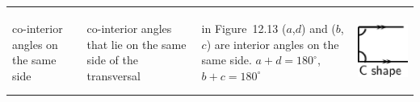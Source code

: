 \begin{center}
\begin{xtabular*}{\mytablewidth}[t]{|p{3cm}|p{3cm}|p{3cm}|p{20\mystarwidth}|}
\begin{center}
      \vspace{2pt}
    \vspace{.1in}
    \end{center}    
     \tabularnewline{}
        co-interior angles on the same side &
        co-interior angles that lie on the same side of the transversal &
        in Figure~12.13 ($a$,\begin{math}d\end{math}) and (\begin{math}b\end{math},\begin{math}c\end{math}) are interior angles on the same side. \begin{math}a+d={180}^{\circ }\end{math}, \begin{math}b+c={180}^{\circ }\end{math} &
    \setcounter{subfigure}{0}
\label{m39370*id316923}
    \begin{center}
    \label{m39370*id316923!!!underscore!!!media}\label{m39370*id316923!!!underscore!!!printimage}\includegraphics{col11306.imgs/m39370_MG10C13_013.png} %

\end{center}
\end{xtabular*}
\end{center}
